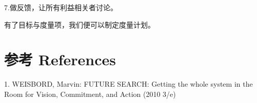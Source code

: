 7.做反馈，让所有利益相关者讨论。

有了目标与度量项，我们便可以制定度量计划。




\hypertarget{ux9644ux4ef6}{%
\section{参考 References}\label{ux9644ux4ef6}}

1. WEISBORD, Marvin: FUTURE SEARCH: Getting the whole system in the Room
for Vision, Commitment, and Action (2010 3/e)\\



